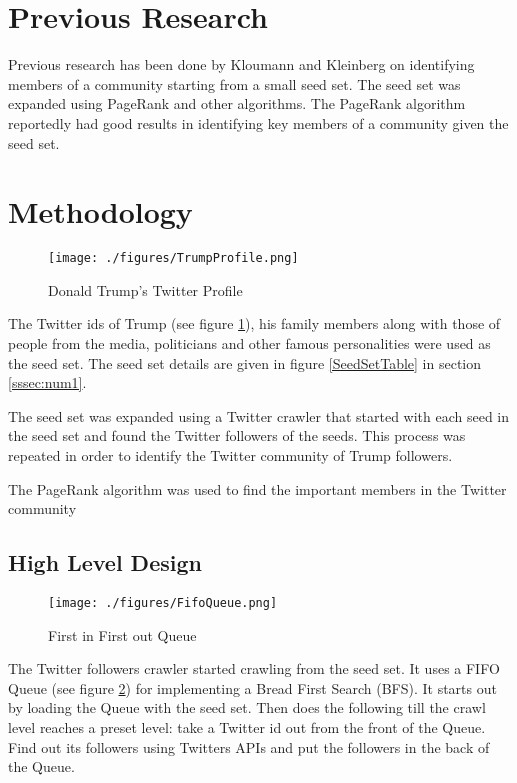 \documentclass{sig-alternate-05-2015}
\begin{document}
\section{Previous Research}

Previous research has been done by Kloumann and Kleinberg \cite{SeedSet} on identifying members of a community starting from a small seed set. The seed set was expanded using PageRank and other algorithms. The PageRank algorithm reportedly had good results in identifying key members of a community given the seed set.

\section{Methodology}
\begin{figure}[!t]
\centering
\texttt{[image: ./figures/TrumpProfile.png]}
\caption{Donald Trump's Twitter Profile}
\label{TrumpProfile}
\end{figure}
The Twitter ids of Trump (see figure \ref{TrumpProfile}), his family members along with those of people from the media, politicians and other famous personalities were used as the seed set\cite{SeedSource}. The seed set details are given in figure \ref{SeedSetTable} in section \ref{sssec:num1}.

The seed set was expanded using a Twitter crawler that started with each seed in the seed set and found the Twitter followers of the seeds. This process was repeated in order to identify the Twitter community of Trump followers.

The PageRank algorithm was used to find the important members in the Twitter community

\subsection{High Level Design}
\begin{figure}[!t]
\centering
\texttt{[image: ./figures/FifoQueue.png]}
\caption{First in First out Queue\cite{Queue}}
\label{FifoQueue}
\end{figure}
The Twitter followers crawler started crawling from the seed set. It uses a FIFO Queue (see figure \ref{FifoQueue}) for implementing a Bread First Search (BFS). It starts out by loading the Queue with the seed set. Then does the following till the crawl level reaches a preset level: take a Twitter id out from the front of the Queue. Find out its followers using Twitters APIs and put the followers in the back of the Queue. 
\end{document}
